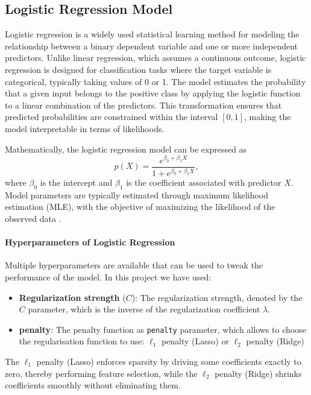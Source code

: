 \subsection{Logistic Regression Model}\label{subsec:method-log-reg}
Logistic regression is a widely used statistical learning method for modeling the relationship between a binary dependent variable and one or more independent predictors. Unlike linear regression, which assumes a continuous outcome, logistic regression is designed for classification tasks where the target variable is categorical, typically taking values of 0 or 1. The model estimates the probability that a given input belongs to the positive class by applying the logistic function to a linear combination of the predictors. This transformation ensures that predicted probabilities are constrained within the interval $[0, 1]$, making the model interpretable in terms of likelihoods.

Mathematically, the logistic regression model can be expressed as
\begin{equation}
    p(X) = \frac{e^{\beta_0 + \beta_1 X}}{1 + e^{\beta_0 + \beta_1 X}},
\end{equation}
where $\beta_0$ is the intercept and $\beta_1$ is the coefficient associated with predictor $X$. Model parameters are typically estimated through maximum likelihood estimation (MLE), with the objective of maximizing the likelihood of the observed data \citep{James2021Logistic}.

\paragraph{Hyperparameters of Logistic Regression}
Multiple hyperparameters are available that can be used to tweak the performance of the model. In this project we have used:
\begin{itemize}
    \item \textbf{Regularization strength} ($C$): The regularization strength, denoted by the $C$ parameter, which is the inverse of the regularization coefficient $\lambda$.
    \item \textbf{penalty}: The penalty function as \texttt{penalty} parameter, which allows to choose the regularisation function to use: $\ell_{1}$ penalty (Lasso) or $\ell_{2}$ penalty (Ridge)
\end{itemize}

The $\ell_{1}$ penalty (Lasso) enforces sparsity by driving some coefficients exactly to zero, thereby performing feature selection, while the $\ell_{2}$ penalty (Ridge) shrinks coefficients smoothly without eliminating them.

